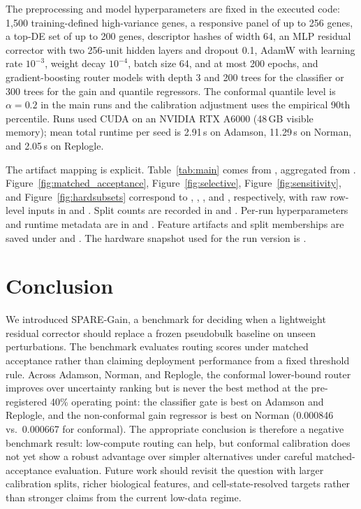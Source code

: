 \documentclass{article}
\begin{document}
The preprocessing and model hyperparameters are fixed in the executed code: 1{,}500 training-defined high-variance genes, a responsive panel of up to 256 genes, a top-DE set of up to 200 genes, descriptor hashes of width 64, an MLP residual corrector with two 256-unit hidden layers and dropout 0.1, AdamW with learning rate $10^{-3}$, weight decay $10^{-4}$, batch size 64, and at most 200 epochs, and gradient-boosting router models with depth 3 and 200 trees for the classifier or 300 trees for the gain and quantile regressors. The conformal quantile level is $\alpha=0.2$ in the main runs and the calibration adjustment uses the empirical 90th percentile. Runs used CUDA on an NVIDIA RTX A6000 (48\,GB visible memory); mean total runtime per seed is 2.91\,s on Adamson, 11.29\,s on Norman, and 2.05\,s on Replogle.

The artifact mapping is explicit. Table~\ref{tab:main} comes from , aggregated from . Figure~\ref{fig:matched_acceptance}, Figure~\ref{fig:selective}, Figure~\ref{fig:sensitivity}, and Figure~\ref{fig:hardsubsets} correspond to , , , and , respectively, with raw row-level inputs in  and . Split counts are recorded in  and . Per-run hyperparameters and runtime metadata are in  and . Feature artifacts and split memberships are saved under  and . The hardware snapshot used for the run version is .

\section{Conclusion}
We introduced SPARE-Gain, a benchmark for deciding when a lightweight residual corrector should replace a frozen pseudobulk baseline on unseen perturbations. The benchmark evaluates routing scores under matched acceptance rather than claiming deployment performance from a fixed threshold rule. Across Adamson, Norman, and Replogle, the conformal lower-bound router improves over uncertainty ranking but is never the best method at the pre-registered 40\% operating point: the classifier gate is best on Adamson and Replogle, and the non-conformal gain regressor is best on Norman (0.000846 vs.\ 0.000667 for conformal). The appropriate conclusion is therefore a negative benchmark result: low-compute routing can help, but conformal calibration does not yet show a robust advantage over simpler alternatives under careful matched-acceptance evaluation. Future work should revisit the question with larger calibration splits, richer biological features, and cell-state-resolved targets rather than stronger claims from the current low-data regime.



\end{document}
